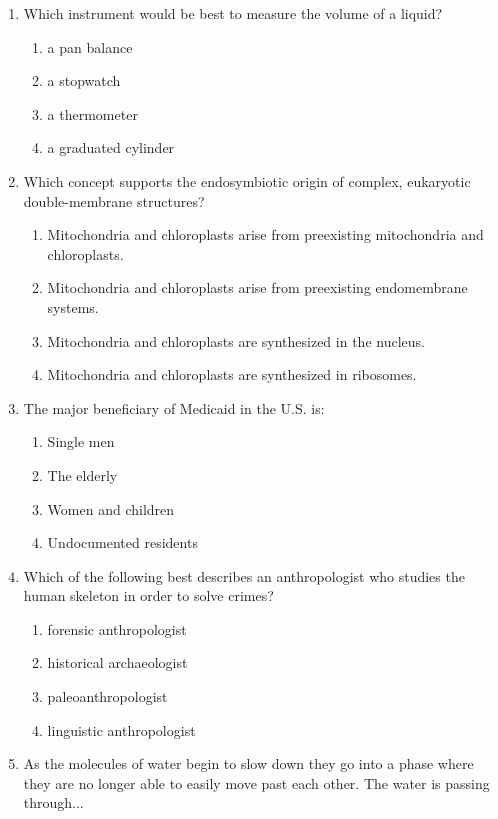 \documentclass[12pt]{article}
\begin{document}
\begin{enumerate}[label=\arabic*.]
\begin{enumerate}[label=(\alph*)]
    \item (x - 1)(x - 4)(x - 2)
\end{enumerate}
\item Which instrument would be best to measure the volume of a liquid?
\begin{enumerate}[label=(\alph*)]
    \item a pan balance
    \item a stopwatch
    \item a thermometer
    \item a graduated cylinder
\end{enumerate}
\item Which concept supports the endosymbiotic origin of complex, eukaryotic double-membrane structures?
\begin{enumerate}[label=(\alph*)]
    \item Mitochondria and chloroplasts arise from preexisting mitochondria and chloroplasts.
    \item Mitochondria and chloroplasts arise from preexisting endomembrane systems.
    \item Mitochondria and chloroplasts are synthesized in the nucleus.
    \item Mitochondria and chloroplasts are synthesized in ribosomes.
\end{enumerate}
\item The major beneficiary of Medicaid in the U.S. is:
\begin{enumerate}[label=(\alph*)]
    \item Single men
    \item The elderly
    \item Women and children
    \item Undocumented residents
\end{enumerate}
\item Which of the following best describes an anthropologist who studies the human skeleton in order to solve crimes?
\begin{enumerate}[label=(\alph*)]
    \item forensic anthropologist
    \item historical archaeologist
    \item paleoanthropologist
    \item linguistic anthropologist
\end{enumerate}
\item As the molecules of water begin to slow down they go into a phase where they are no longer able to easily move past each other. The water is passing through...

\end{enumerate}
\end{document}
